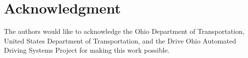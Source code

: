 \documentclass[journal,onecolumn]{IEEEtran}
\begin{document}
\justifying
\section*{Acknowledgment}


	{The authors would like to acknowledge the Ohio Department of Transportation, United States Department of Transportation, and the Drive Ohio Automated Driving Systems Project for making this work possible.}


\ifCLASSOPTIONcaptionsoff
\newpage
\fi





%
%
%


	  
	 





\end{document}
